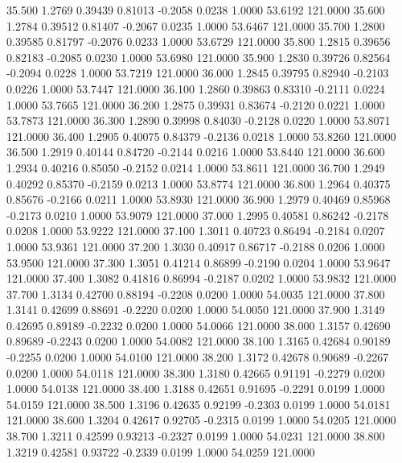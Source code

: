   35.500   1.2769   0.39439   0.81013  -0.2058   0.0238   1.0000  53.6192 121.0000
  35.600   1.2784   0.39512   0.81407  -0.2067   0.0235   1.0000  53.6467 121.0000
  35.700   1.2800   0.39585   0.81797  -0.2076   0.0233   1.0000  53.6729 121.0000
  35.800   1.2815   0.39656   0.82183  -0.2085   0.0230   1.0000  53.6980 121.0000
  35.900   1.2830   0.39726   0.82564  -0.2094   0.0228   1.0000  53.7219 121.0000
  36.000   1.2845   0.39795   0.82940  -0.2103   0.0226   1.0000  53.7447 121.0000
  36.100   1.2860   0.39863   0.83310  -0.2111   0.0224   1.0000  53.7665 121.0000
  36.200   1.2875   0.39931   0.83674  -0.2120   0.0221   1.0000  53.7873 121.0000
  36.300   1.2890   0.39998   0.84030  -0.2128   0.0220   1.0000  53.8071 121.0000
  36.400   1.2905   0.40075   0.84379  -0.2136   0.0218   1.0000  53.8260 121.0000
  36.500   1.2919   0.40144   0.84720  -0.2144   0.0216   1.0000  53.8440 121.0000
  36.600   1.2934   0.40216   0.85050  -0.2152   0.0214   1.0000  53.8611 121.0000
  36.700   1.2949   0.40292   0.85370  -0.2159   0.0213   1.0000  53.8774 121.0000
  36.800   1.2964   0.40375   0.85676  -0.2166   0.0211   1.0000  53.8930 121.0000
  36.900   1.2979   0.40469   0.85968  -0.2173   0.0210   1.0000  53.9079 121.0000
  37.000   1.2995   0.40581   0.86242  -0.2178   0.0208   1.0000  53.9222 121.0000
  37.100   1.3011   0.40723   0.86494  -0.2184   0.0207   1.0000  53.9361 121.0000
  37.200   1.3030   0.40917   0.86717  -0.2188   0.0206   1.0000  53.9500 121.0000
  37.300   1.3051   0.41214   0.86899  -0.2190   0.0204   1.0000  53.9647 121.0000
  37.400   1.3082   0.41816   0.86994  -0.2187   0.0202   1.0000  53.9832 121.0000
  37.700   1.3134   0.42700   0.88194  -0.2208   0.0200   1.0000  54.0035 121.0000
  37.800   1.3141   0.42699   0.88691  -0.2220   0.0200   1.0000  54.0050 121.0000
  37.900   1.3149   0.42695   0.89189  -0.2232   0.0200   1.0000  54.0066 121.0000
  38.000   1.3157   0.42690   0.89689  -0.2243   0.0200   1.0000  54.0082 121.0000
  38.100   1.3165   0.42684   0.90189  -0.2255   0.0200   1.0000  54.0100 121.0000
  38.200   1.3172   0.42678   0.90689  -0.2267   0.0200   1.0000  54.0118 121.0000
  38.300   1.3180   0.42665   0.91191  -0.2279   0.0200   1.0000  54.0138 121.0000
  38.400   1.3188   0.42651   0.91695  -0.2291   0.0199   1.0000  54.0159 121.0000
  38.500   1.3196   0.42635   0.92199  -0.2303   0.0199   1.0000  54.0181 121.0000
  38.600   1.3204   0.42617   0.92705  -0.2315   0.0199   1.0000  54.0205 121.0000
  38.700   1.3211   0.42599   0.93213  -0.2327   0.0199   1.0000  54.0231 121.0000
  38.800   1.3219   0.42581   0.93722  -0.2339   0.0199   1.0000  54.0259 121.0000
